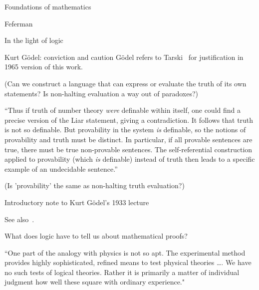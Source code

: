 \begin{plSection}{Foundations of mathematics}
\begin{plSection}{Feferman}
\begin{plSection}{In the light of logic}
\begin{plSection}{Kurt G\"{o}del: conviction and caution}
G\"{o}del refers to 
Tarski~\cite{Tarski1944:SemanticTruth,Tarski:1983:LogicEtc} 
for justification in 1965 version 
of this work.~\cite{Godel:1986:CollectedWorksI}
 
(Can we construct a language that can express 
or evaluate the truth of 
its own statements? 
Is non-halting evaluation a way out of paradoxes?)

``Thus if truth of number theory \textit{were}
definable within itself, one could find a precise version of the
Liar statement, giving a contradiction.
It follows that truth is not so definable.
But provability in the system \textit{is} definable,
so the notions of provability and truth must be distinct.
In particular, if all provable sentences are true,
there must be true non-provable sentences.
The self-referential construction applied to provability
(which \textit{is} definable) instead of truth then 
leads to a specific example of an undecidable 
sentence.''~\cite[p~159]{Feferman:1998:LightOfLogic}

(Is 'provability' the same as non-halting truth evaluation?)

\end{plSection}%
\begin{plSection}{Introductory note to Kurt G\"{o}del's 1933 lecture}
\label{sec:Introductory_note_Godel_1933}

\cite[ch~8 ``Introductory note to Kurt G\"{o}del's 1933 lecture'']{Feferman:1998:LightOfLogic}

See also~\cite{Godel:1995:CollectedWorksIII}.

\end{plSection}%
\begin{plSection}{What does logic have to tell us about mathematical proofs?}
\label{sec:What_does_logic_tell_us_about_proofs}

\cite[ch~9 ``What does logic have to tell us about mathematical proofs?'']{Feferman:1998:LightOfLogic}

``One part of the analogy with physics is not so apt.
The experimental method provides highly sophisticated, refined
means to test physical theories {\ldots}.
We have no such tests of logical theories.
Rather it is primarily a matter of individual judgment
how well these square with ordinary
experience."~\cite[p~178]{Feferman:1998:LightOfLogic}


\end{plSection}
\end{plSection}
\end{plSection}
\end{plSection}
